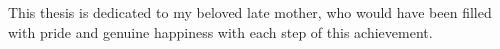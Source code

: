 \addvspacetoc{0.3cm}

\tableofcontents %

\listoffigures %

\listofgraphics %

\listoftables %










% 




\glsaddall

\printglossary[type=\acronymtype,title=Acronyms]



\begin{dedicatory}
	This thesis is dedicated to my beloved late mother, who would have been filled with pride and genuine happiness with each step of this achievement. 
\end{dedicatory}
